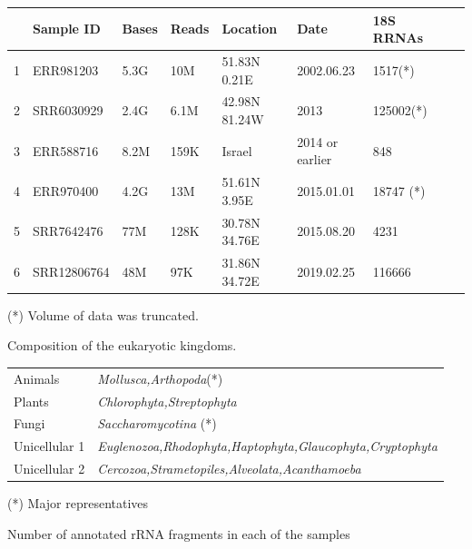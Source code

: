 \documentclass[a4paper]{article}
\begin{document}
\begin{tabular}{lllllllll}
\hline
&Sample ID&Bases&Reads&Location&Date&18S RRNAs\\
\hline
1&ERR981203&5.3G&10M&51.83N 0.21E&2002.06.23&1517(*)\\
2&SRR6030929&2.4G&6.1M&42.98N 81.24W&2013&125002(*)\\
3&ERR588716&8.2M&159K&Israel&2014 or earlier&848\\
4&ERR970400&4.2G&13M&51.61N 3.95E&2015.01.01&18747 (*)\\
5&SRR7642476&77M&128K&30.78N 34.76E&2015.08.20&4231\\
6&SRR12806764&48M&97K&31.86N 34.72E&2019.02.25&116666\\
\hline
\end{tabular}

{\small(*) Volume of data was truncated.}

\vskip 5pt

Composition of the eukaryotic kingdoms.

\vskip 5pt

\begin{tabular}{ll}
\hline
Animals&\textit{Mollusca,Arthopoda}(*)\\
Plants&\textit{Chlorophyta,Streptophyta}\\
Fungi&\textit{Saccharomycotina} (*)\\
Unicellular 1&\textit{Euglenozoa,Rhodophyta,Haptophyta,Glaucophyta,Cryptophyta}\\
Unicellular 2&\textit{Cercozoa,Strametopiles,Alveolata,Acanthamoeba}\\
\hline
\end{tabular}

{\small(*) Major representatives}

\vskip 5pt

\newpage
Number of annotated rRNA fragments in each of the samples

\vskip 5pt
\end{document}
